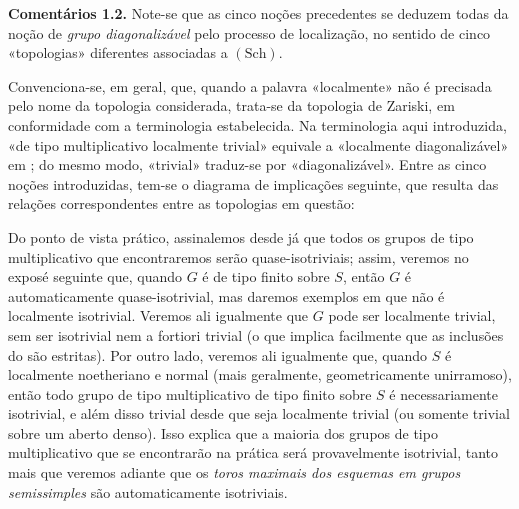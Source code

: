 \medskip
\noindent{}\textbf{Comentários 1.2.}
Note-se que as cinco noções precedentes se deduzem todas da noção de
\emph{grupo diagonalizável} pelo processo de localização, no sentido de cinco
«topologias» diferentes associadas a \((\mathrm{Sch})\).

Convenciona-se, em geral, que, quando a palavra «localmente» não é
precisada pelo nome da topologia considerada, trata-se da topologia de
Zariski, em conformidade com a terminologia estabelecida. Na terminologia
aqui introduzida, «de tipo multiplicativo localmente trivial» equivale a
«localmente diagonalizável» em
; do mesmo modo, «trivial»
traduz-se por «diagonalizável». Entre as cinco noções introduzidas,
tem-se o diagrama de implicações seguinte, que resulta das relações
correspondentes entre as topologias em questão:

\begin{center}
\end{center}

Do ponto de vista prático, assinalemos desde já que todos os grupos de
tipo multiplicativo que encontraremos serão quase-isotriviais; assim,
veremos no exposé seguinte que, quando \(G\) é de tipo finito sobre
\(S\), então \(G\) é automaticamente quase-isotrivial, mas daremos
exemplos em que não é localmente isotrivial. Veremos ali igualmente que
\(G\) pode ser localmente trivial, sem ser isotrivial nem a fortiori
trivial (o que implica facilmente que as inclusões do
 são estritas).
Por outro lado, veremos ali igualmente que, quando \(S\) é localmente
noetheriano e normal (mais geralmente, geometricamente unirramoso),
então todo grupo de tipo multiplicativo de tipo finito sobre \(S\)
é necessariamente isotrivial, e além disso trivial desde que seja
localmente trivial (ou somente trivial sobre um aberto denso). Isso
explica que a maioria dos grupos de tipo multiplicativo que se
encontrarão na prática será provavelmente isotrivial, tanto mais que
veremos adiante que os \emph{toros maximais dos esquemas em grupos
semissimples} são automaticamente isotriviais.

